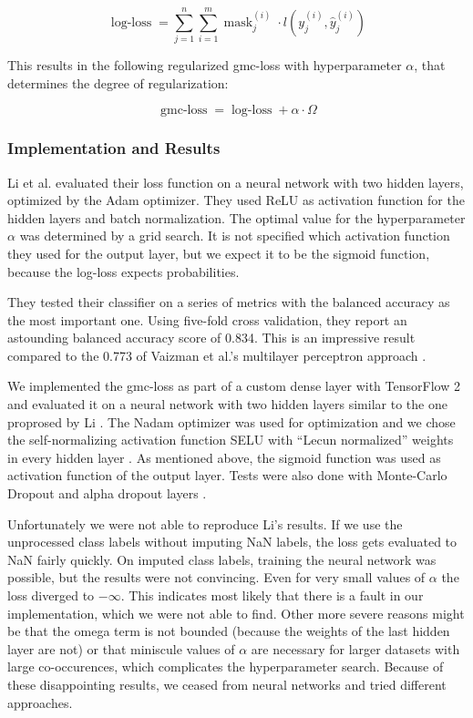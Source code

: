 \begin{equation}
	\operatorname{log-loss} = \sum_{j=1}^{n}\sum_{i=1}^{m} \operatorname{mask}_j^{(i)} \cdot l(y_j^{(i)}, \hat{y}_j^{(i)})
\end{equation}

This results in the following regularized gmc-loss with hyperparameter $\alpha$, that determines the degree of regularization:

\begin{equation}
	\operatorname{gmc-loss} = \operatorname{log-loss} + \alpha \cdot \Omega
\end{equation}

\subsubsection{Implementation and Results}

Li et al. evaluated their loss function on a neural network with two hidden layers, optimized by the Adam optimizer. They used ReLU as activation function for the hidden layers and batch normalization. The optimal value for the hyperparameter $\alpha$ was determined by a grid search. It is not specified which activation function they used for the output layer, but we expect it to be the sigmoid function, because the log-loss expects probabilities.

They tested their classifier on a series of metrics with the balanced accuracy as the most important one. Using five-fold cross validation, they report an astounding balanced accuracy score of 0.834. This is an impressive result compared to the 0.773 of Vaizman et al.'s multilayer perceptron approach \cite{Vaizman18}.

We implemented the gmc-loss as part of a custom dense layer with TensorFlow 2 and evaluated it on a neural network with two hidden layers similar to the one proprosed by Li \cite{tensorflow2015}. The Nadam optimizer was used for optimization \cite{Dozat2015} and we chose the self-normalizing activation function SELU with \enquote{Lecun normalized} weights in every hidden layer \cite{Klambauer17}. As mentioned above, the sigmoid function was used as activation function of the output layer. Tests were also done with Monte-Carlo Dropout and alpha dropout layers \cite{Gal2016}.

Unfortunately we were not able to reproduce Li's results. If we use the unprocessed class labels without imputing NaN labels, the loss gets evaluated to NaN fairly quickly. On imputed class labels, training the neural network was possible, but the results were not convincing. Even for very small values of $\alpha$ the loss diverged to $-\infty$. This indicates most likely that there is a fault in our implementation, which we were not able to find. Other more severe reasons might be that the omega term is not bounded (because the weights of the last hidden layer are not) or that miniscule values of $\alpha$ are necessary for larger datasets with large co-occurences, which complicates the hyperparameter search.
Because of these disappointing results, we ceased from neural networks and tried different approaches. 